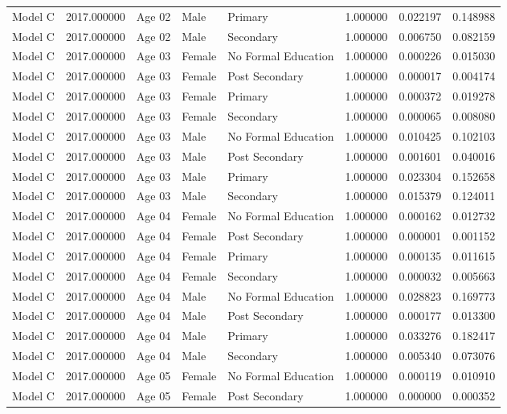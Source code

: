 \begin{table}[ht]
\begin{tabular}{lrlllrrr}
Model C & 2017.000000 & Age 02 & Male & Primary & 1.000000 & 0.022197 & 0.148988 \\
Model C & 2017.000000 & Age 02 & Male & Secondary & 1.000000 & 0.006750 & 0.082159 \\
Model C & 2017.000000 & Age 03 & Female & No Formal Education & 1.000000 & 0.000226 & 0.015030 \\
Model C & 2017.000000 & Age 03 & Female & Post Secondary & 1.000000 & 0.000017 & 0.004174 \\
Model C & 2017.000000 & Age 03 & Female & Primary & 1.000000 & 0.000372 & 0.019278 \\
Model C & 2017.000000 & Age 03 & Female & Secondary & 1.000000 & 0.000065 & 0.008080 \\
Model C & 2017.000000 & Age 03 & Male & No Formal Education & 1.000000 & 0.010425 & 0.102103 \\
Model C & 2017.000000 & Age 03 & Male & Post Secondary & 1.000000 & 0.001601 & 0.040016 \\
Model C & 2017.000000 & Age 03 & Male & Primary & 1.000000 & 0.023304 & 0.152658 \\
Model C & 2017.000000 & Age 03 & Male & Secondary & 1.000000 & 0.015379 & 0.124011 \\
Model C & 2017.000000 & Age 04 & Female & No Formal Education & 1.000000 & 0.000162 & 0.012732 \\
Model C & 2017.000000 & Age 04 & Female & Post Secondary & 1.000000 & 0.000001 & 0.001152 \\
Model C & 2017.000000 & Age 04 & Female & Primary & 1.000000 & 0.000135 & 0.011615 \\
Model C & 2017.000000 & Age 04 & Female & Secondary & 1.000000 & 0.000032 & 0.005663 \\
Model C & 2017.000000 & Age 04 & Male & No Formal Education & 1.000000 & 0.028823 & 0.169773 \\
Model C & 2017.000000 & Age 04 & Male & Post Secondary & 1.000000 & 0.000177 & 0.013300 \\
Model C & 2017.000000 & Age 04 & Male & Primary & 1.000000 & 0.033276 & 0.182417 \\
Model C & 2017.000000 & Age 04 & Male & Secondary & 1.000000 & 0.005340 & 0.073076 \\
Model C & 2017.000000 & Age 05 & Female & No Formal Education & 1.000000 & 0.000119 & 0.010910 \\
Model C & 2017.000000 & Age 05 & Female & Post Secondary & 1.000000 & 0.000000 & 0.000352 \\

\end{tabular}
\end{table}
